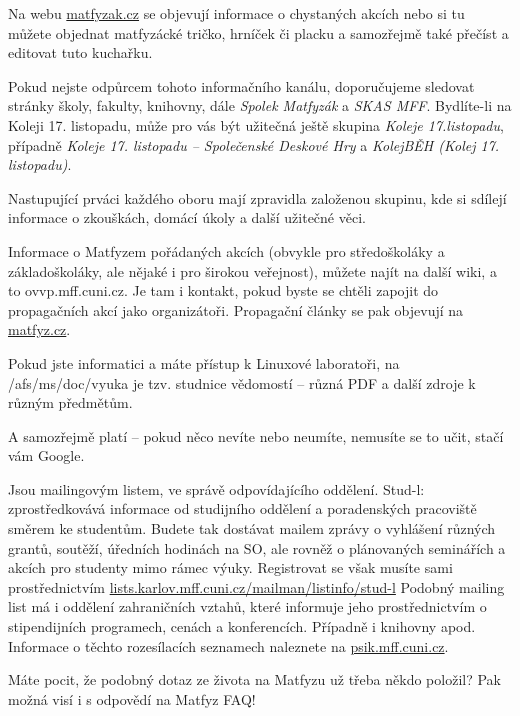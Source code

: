 Na webu \url{matfyzak.cz} se objevují informace o chystaných akcích nebo si tu
můžete objednat matfyzácké tričko, hrníček či placku a samozřejmě také přečíst a
editovat tuto kuchařku.


Pokud nejste odpůrcem tohoto informačního kanálu, doporučujeme sledovat stránky
školy, fakulty, knihovny, dále \textit{Spolek Matfyzák} a \textit{SKAS MFF}.
Bydlíte-li na Koleji 17. listopadu, může pro vás být užitečná ještě skupina
\textit{Koleje 17.listopadu}, případně \textit{Koleje 17. listopadu –
Společenské Deskové Hry} a \textit{KolejBĚH (Kolej 17. listopadu)}.

Nastupující prváci každého oboru mají zpravidla založenou skupinu, kde si
sdílejí informace o zkouškách, domácí úkoly a další užitečné věci.


Informace o Matfyzem pořádaných akcích (obvykle pro středoškoláky a
základoškoláky, ale nějaké i pro širokou veřejnost), můžete najít na další wiki,
a to ovvp.mff.cuni.cz. Je tam i kontakt, pokud byste se chtěli zapojit do
propagačních akcí jako organizátoři. Propagační články se pak objevují na
\url{matfyz.cz}.


Pokud jste informatici a máte přístup k Linuxové laboratoři, na
/afs/ms/doc/vyuka je tzv. studnice vědomostí – různá PDF a další zdroje k různým
předmětům.


A samozřejmě platí – pokud něco nevíte nebo neumíte, nemusíte se to učit, stačí
vám Google.


Jsou mailingovým listem, ve správě odpovídajícího oddělení. Stud-l:
zprostředkovává informace od studijního oddělení a poradenských pracoviště
směrem ke studentům. Budete tak dostávat mailem zprávy o vyhlášení různých
grantů, soutěží, úředních hodinách na SO, ale rovněž o plánovaných seminářích a
akcích pro studenty mimo rámec výuky. Registrovat se však musíte sami
prostřednictvím \url{lists.karlov.mff.cuni.cz/mailman/listinfo/stud-l} Podobný
mailing list má i oddělení zahraničních vztahů, které informuje jeho
prostřednictvím o stipendijních programech, cenách a konferencích. Případně i
knihovny apod. Informace o těchto rozesílacích seznamech naleznete na
\url{psik.mff.cuni.cz}.


Máte pocit, že podobný dotaz ze života na Matfyzu už třeba někdo položil? Pak
možná visí i s odpovědí na Matfyz FAQ!


